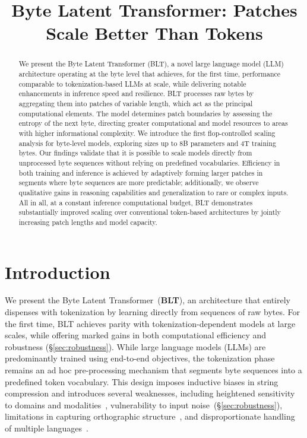 \title{Byte Latent Transformer: Patches Scale Better Than Tokens}

\begin{abstract}
We present the Byte Latent Transformer ({\textsc BLT}), a novel large language model (LLM) architecture operating at the byte level that achieves, for the first time, performance comparable to tokenization-based LLMs at scale, while delivering notable enhancements in inference speed and resilience. 
{\textsc BLT} processes raw bytes by aggregating them into patches of variable length, which act as the principal computational elements. The model determines patch boundaries by assessing the entropy of the next byte, directing greater computational and model resources to areas with higher informational complexity. We introduce the first flop-controlled scaling analysis for byte-level models, exploring sizes up to 8B parameters and 4T training bytes. Our findings validate that it is possible to scale models directly from unprocessed byte sequences without relying on predefined vocabularies. Efficiency in both training and inference is achieved by adaptively forming larger patches in segments where byte sequences are more predictable; additionally, we observe qualitative gains in reasoning capabilities and generalization to rare or complex inputs. All in all, at a constant inference computational budget, {\textsc BLT} demonstrates substantially improved scaling over conventional token-based architectures by jointly increasing patch lengths and model capacity.
\end{abstract}

\section{Introduction}
\label{section:intro}

We present the Byte Latent Transformer~(\textbf{BLT}), an architecture that entirely dispenses with tokenization by learning directly from sequences of raw bytes. For the first time, BLT achieves parity with tokenization-dependent models at large scales, while offering marked gains in both computational efficiency and robustness (\S\ref{sec:robustness}). While large language models (LLMs) are predominantly trained using end-to-end objectives, the tokenization phase remains an ad hoc pre-processing mechanism that segments byte sequences into a predefined token vocabulary. This design imposes inductive biases in string compression and introduces several weaknesses, including heightened sensitivity to domains and modalities~\citep{dagangetting}, vulnerability to input noise~(\S\ref{sec:robustness}), limitations in capturing orthographic structure~\citep{edman2024cute}, and disproportionate handling of multiple languages~\citep{liang2023xlm,petrov2024language,limisiewicz2024myte}.


